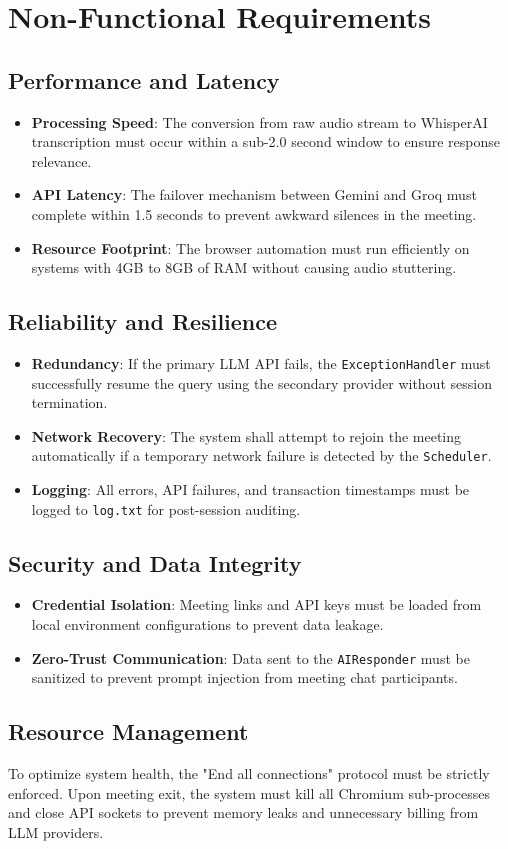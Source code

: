 \documentclass[12pt]{article}
\begin{document}
\section{Non-Functional Requirements}

\subsection{Performance and Latency}
\begin{itemize}
    \item \textbf{Processing Speed}: The conversion from raw audio stream to WhisperAI transcription must occur within a sub-2.0 second window to ensure response relevance.
    \item \textbf{API Latency}: The failover mechanism between Gemini and Groq must complete within 1.5 seconds to prevent awkward silences in the meeting.
    \item \textbf{Resource Footprint}: The browser automation must run efficiently on systems with 4GB to 8GB of RAM without causing audio stuttering.
\end{itemize}

\subsection{Reliability and Resilience}
\begin{itemize}
    \item \textbf{Redundancy}: If the primary LLM API fails, the \texttt{ExceptionHandler} must successfully resume the query using the secondary provider without session termination.
    \item \textbf{Network Recovery}: The system shall attempt to rejoin the meeting automatically if a temporary network failure is detected by the \texttt{Scheduler}.
    \item \textbf{Logging}: All errors, API failures, and transaction timestamps must be logged to \texttt{log.txt} for post-session auditing.
\end{itemize}

\subsection{Security and Data Integrity}
\begin{itemize}
    \item \textbf{Credential Isolation}: Meeting links and API keys must be loaded from local environment configurations to prevent data leakage.
    \item \textbf{Zero-Trust Communication}: Data sent to the \texttt{AIResponder} must be sanitized to prevent prompt injection from meeting chat participants.
\end{itemize}

\subsection{Resource Management}
To optimize system health, the "End all connections" protocol must be strictly enforced. Upon meeting exit, the system must kill all Chromium sub-processes and close API sockets to prevent memory leaks and unnecessary billing from LLM providers.
\end{document}
